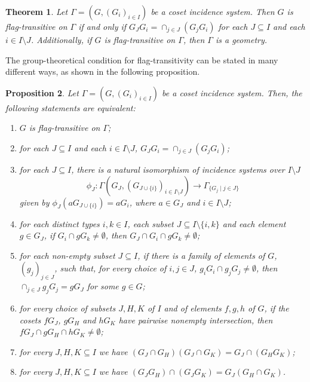 \documentclass[11pt,letterpaper]{amsart}
\newenvironment{red}{\relax\color{red}}{\hspace*{.5ex}\relax}
\newcommand{\bcp}{\begin{red} }
\newcommand{\ecp}{\end{red}}
\newtheorem{prop}{Proposition}[section]
\newtheorem{thm}[prop]{Theorem}
\begin{document}
\begin{thm}\cite[Theorem 1.8.10]{buekenhout2013diagram}\label{thm:cosetFT}
Let $\Gamma = (G,(G_i)_{i\in I})$ be a coset incidence system. Then $G$ is flag-transitive on $\Gamma$ if and only if $G_JG_i = \cap_{j \in J}(G_jG_i)$ for each $J \subseteq I$ and each $i\in I\setminus J$.
Additionally, if $G$ is flag-transitive on $\Gamma$, then $\Gamma$ is a geometry.
\end{thm}

The group-theoretical condition for flag-transitivity can be stated in many different ways, as shown in the following proposition.

\begin{prop}\label{prop:FTequivs}
    Let $\Gamma = (G,(G_i)_{i\in I})$ be a coset incidence system. Then, the following statements are equivalent:
    \begin{enumerate}
        \item $G$ is flag-transitive on $\Gamma$;\label{prop:FTequivs:itm:IsFT}
        \item for each $J\subseteq I$ and each $i\in I\setminus J$, $G_JG_i=\cap_{j\in J}(G_jG_i)$;\label{prop:FTequivs:itm:FTBueken}
        \item for each $J\subseteq 
        I$, there is a natural isomorphism of incidence systems over $I\setminus J$
        $$\phi_J: \Gamma(G_J, (G_{J\cup \{i\}})_{i\in I\setminus J})\to \Gamma_{\{G_j\mid j\in J\}}$$
        given by $\phi_J(aG_{J\cup \{i\}})= a G_i$, where $a\in G_J$ and $i\in I\setminus J$;\label{prop:FTequivs:itm:Isomorphism}
        \item for each distinct types $i,k\in I$, each subset $J\subseteq I\setminus\{i,k\}$ and each element $g\in G_J$, if $G_i\cap gG_k\neq \emptyset$, then $G_J\cap G_i\cap gG_k \neq \emptyset$;\label{prop:FTequivs:itm:FTPassini}
        \item for each non-empty subset $J\subseteq I$, if there is a family of elements of $G$, $(g_j)_{j\in J}$,  such that, for every choice of $i,j\in J$, $g_iG_i \cap g_j G_j\neq \emptyset$, then $\cap _{j\in J}g_jG_j = g G_J$ for some $g\in G$;\label{prop:FTequivs:itm:FTPassiniProp}
        \item for every choice of subsets $J,H,K$ of $I$ and of elements $f,g,h$ of $G$, if the cosets $fG_J$, $gG_H$ and $hG_K$ have pairwise nonempty intersection, then $fG_J\cap gG_H\cap hG_K\neq \emptyset$;\label{prop:FTequivs:itm:FTIntersectionCosets}
        \item for every $J,H,K\subseteq I$ we have 
            $(G_J\cap G_H)(G_J\cap G_K)= G_J\cap (G_HG_K)$;\label{prop:FTequivs:itm:FTProductOfIntersections}
        \item for every $J,H,K\subseteq I$ we have 
        $(G_JG_H)\cap (G_JG_K) = G_J(G_H\cap G_K)$.\label{prop:FTequivs:itm:FTIntersectionOfProducts}
    \end{enumerate}
\end{prop}
\end{document}
